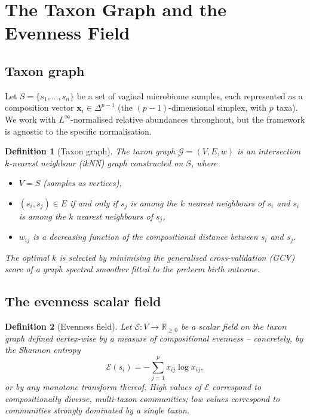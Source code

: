 \documentclass[11pt]{article}
\theoremstyle{plain}
\newtheorem{definition}{Definition}[section]
\newcommand{\E}{\mathcal{E}}
\newcommand{\G}{\mathcal{G}}
\newcommand{\R}{\mathbb{R}}
\begin{document}
\section{The Taxon Graph and the Evenness Field}
\label{sec:setup}

\subsection{Taxon graph}
\label{sec:graph}

Let $S = \{s_1, \ldots, s_n\}$ be a set of vaginal microbiome samples, each
represented as a composition vector $\mathbf{x}_i \in \Delta^{p-1}$ (the
$(p{-}1)$-dimensional simplex, with $p$ taxa).  We work with
$L^\infty$-normalised relative abundances throughout, but the framework is
agnostic to the specific normalisation.

\begin{definition}[Taxon graph]
  The \emph{taxon graph} $\G = (V, E, w)$ is an intersection $k$-nearest
  neighbour (ikNN) graph constructed on $S$, where
  \begin{itemize}[noitemsep]
    \item $V = S$ (samples as vertices),
    \item $(s_i, s_j) \in E$ if and only if $s_j$ is among the $k$ nearest
          neighbours of $s_i$ \emph{and} $s_i$ is among the $k$ nearest
          neighbours of $s_j$,
    \item $w_{ij}$ is a decreasing function of the compositional distance
          between $s_i$ and $s_j$.
  \end{itemize}
  The optimal $k$ is selected by minimising the generalised cross-validation
  (GCV) score of a graph spectral smoother fitted to the preterm birth outcome.
\end{definition}

\subsection{The evenness scalar field}
\label{sec:evenness}

\begin{definition}[Evenness field]
  Let $\E : V \to \R_{\geq 0}$ be a scalar field on the taxon graph defined
  vertex-wise by a measure of compositional evenness -- concretely, by the
  Shannon entropy
  \[
    \E(s_i) = -\sum_{j=1}^{p} x_{ij} \log x_{ij},
  \]
  or by any monotone transform thereof.  High values of $\E$ correspond to
  compositionally diverse, multi-taxon communities; low values correspond to
  communities strongly dominated by a single taxon.
\end{definition}
\end{document}
